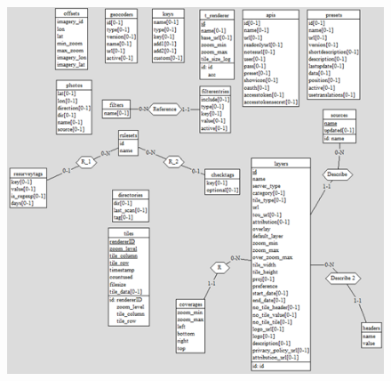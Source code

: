 \begin{figure}[!ht]
    \centering
    \includegraphics[scale=1]{schema_conceptuel.png}
    \label{fig:schéma conceptuel}
\end{figure}
